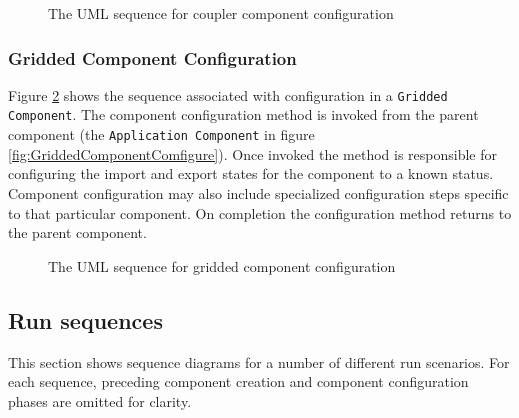 \begin{figure}
\caption[{Coupler Component Configuration}]
{The UML sequence for coupler component configuration}
\label{fig:CouplerComponentConfigure}
\end{figure}

\subsubsection{Gridded Component Configuration}
Figure \ref{fig:GriddedComponentConfigure} shows the sequence associated 
with configuration in a {\tt Gridded Component}. The component configuration
method is invoked from the parent component (the {\tt Application Component}
in figure \ref{fig:GriddedComponentComfigure}). Once invoked the method
is responsible for configuring the import and export states for the 
component to a known status. Component configuration may also include
specialized configuration steps specific to that particular
component. On completion the configuration method returns to the
parent component.

\begin{figure}
\caption[{Gridded Component Configuration}]
{The UML sequence for gridded component configuration}
\label{fig:GriddedComponentConfigure}
\end{figure}

\subsection{Run sequences}
This section shows sequence diagrams for a number of different run scenarios.
For each sequence, preceding component creation and component configuration 
phases are omitted for clarity.

